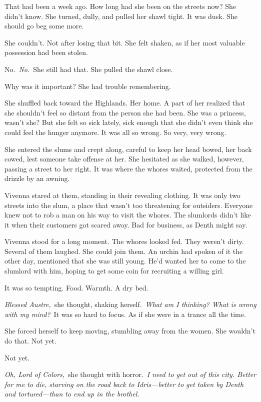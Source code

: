 That had been a week ago. How long had she been on the streets now? She didn’t know. She turned, dully, and pulled her shawl tight. It was dusk. She should go beg some more.

She couldn’t. Not after losing that bit. She felt shaken, as if her most valuable possession had been stolen.

No.~\textit{No.}~She still had that. She pulled the shawl close.

Why was it important? She had trouble remembering.

She shuffled back toward the Highlands. Her home. A part of her realized that she shouldn’t feel so distant from the person she had been. She was a princess, wasn’t she? But she felt so sick lately, sick enough that she didn’t even think she could feel the hunger anymore. It was all so wrong. So very, very wrong.

She entered the slums and crept along, careful to keep her head bowed, her back cowed, lest someone take offense at her. She hesitated as she walked, however, passing a street to her right. It was where the whores waited, protected from the drizzle by an awning.

Vivenna stared at them, standing in their revealing clothing. It was only two streets into the slum, a place that wasn’t too threatening for outsiders. Everyone knew not to rob a man on his way to visit the whores. The slumlords didn’t like it when their customers got scared away. Bad for business, as Denth might say.

Vivenna stood for a long moment. The whores looked fed. They weren’t dirty. Several of them laughed. She could join them. An urchin had spoken of it the other day, mentioned that she was still young. He’d wanted her to come to the slumlord with him, hoping to get some coin for recruiting a willing girl.

It was so tempting. Food. Warmth. A dry bed.

\textit{Blessed Austre,}~she thought, shaking herself.~\textit{What am I thinking? What is wrong with my mind?}~It was so hard to focus. As if she were in a trance all the time.

She forced herself to keep moving, stumbling away from the women. She wouldn’t do that. Not yet.

Not yet.

\textit{Oh, Lord of Colors,}~she thought with horror.~\textit{I need to get out of this city. Better for me to die, starving on the road back to Idris—better to get taken by Denth and tortured—than to end up in the brothel.}

